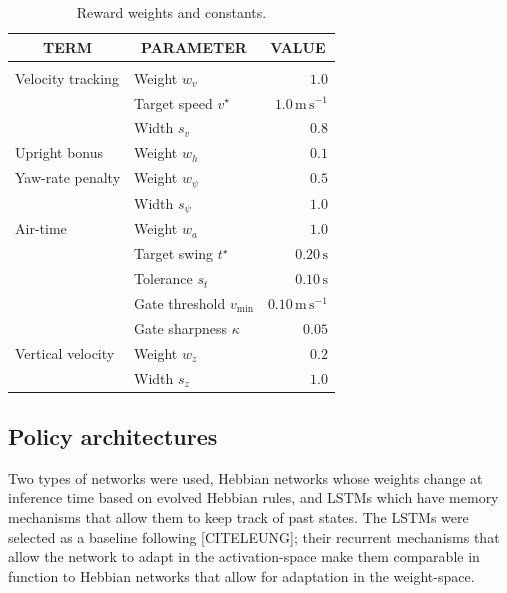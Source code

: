 \documentclass{article} %
\begin{document}
\begin{table}[t]
\caption{Reward weights and constants.}
\label{tab:reward-params}
\begin{center}
\begin{tabular}{llr}
\multicolumn{1}{c}{\bf TERM} & \multicolumn{1}{c}{\bf PARAMETER}
& \multicolumn{1}{c}{\bf VALUE} \\
\hline \\
Velocity tracking & Weight $w_v$ & $1.0$ \\
                  & Target speed $v^\star$ & $1.0\,\mathrm{m\,s^{-1}}$ \\
                  & Width $s_v$ & $0.8$ \\
[0.5em]
Upright bonus     & Weight $w_h$ & $0.1$ \\
[0.5em]
Yaw-rate penalty  & Weight $w_\psi$ & $0.5$ \\
                  & Width $s_\psi$ & $1.0$ \\
[0.5em]
Air-time          & Weight $w_a$ & $1.0$ \\
                  & Target swing $t^\star$ & $0.20\,\mathrm{s}$ \\
                  & Tolerance $s_t$ & $0.10\,\mathrm{s}$ \\
                  & Gate threshold $v_{\mathrm{min}}$ & $0.10\,\mathrm{m\,s^{-1}}$ \\
                  & Gate sharpness $\kappa$ & $0.05$ \\
[0.5em]
Vertical velocity & Weight $w_z$ & $0.2$ \\
                  & Width $s_z$ & $1.0$ \\
\end{tabular}
\end{center}
\end{table}

\subsection{Policy architectures}
\label{subsec:policy_architectures}

Two types of networks were used, Hebbian networks whose weights change at inference time based on evolved Hebbian rules, and LSTMs which have memory mechanisms that allow them to keep track of past states. The LSTMs were selected as a baseline following [CITELEUNG]; their recurrent mechanisms that allow the network to adapt in the activation-space make them comparable in function to Hebbian networks that allow for adaptation in the weight-space. 
\end{document}
